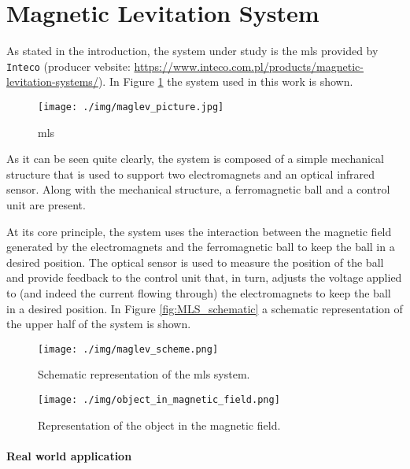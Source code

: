 \section{Magnetic Levitation System}
\label{sec:magnetic_levitation_system}

As stated in the introduction, the system under study is the \acrfull{mls} provided by \texttt{Inteco} (producer vebsite: \url{https://www.inteco.com.pl/products/magnetic-levitation-systems/}).
In Figure \ref{fig:MLS} the system used in this work is shown.

\begin{figure}[H]
    \centering
    \texttt{[image: ./img/maglev\_picture.jpg]}
    \caption{\acrlong{mls}}
    \label{fig:MLS}
\end{figure}

As it can be seen quite clearly, the system is composed of a simple mechanical structure that is used to support two electromagnets and an optical infrared sensor.
Along with the mechanical structure, a ferromagnetic ball and a control unit are present.

At its core principle, the system uses the interaction between the magnetic field generated by the electromagnets and the ferromagnetic ball to keep the ball in a desired position.
The optical sensor is used to measure the position of the ball and provide feedback to the control unit that, in turn, adjusts the voltage applied to (and indeed the current flowing through) the electromagnets to keep the ball in a desired position.
In Figure \ref{fig:MLS_schematic} a schematic representation of the upper half of the system is shown.

\begin{figure}[H]
    \centering
    \begin{minipage}{0.45\textwidth}
        \centering
        \texttt{[image: ./img/maglev\_scheme.png]}
        \caption{Schematic representation of the \acrshort{mls} system.}
        \label{fig:MLS_schematic}
    \end{minipage}
    \hfill
    \begin{minipage}{0.45\textwidth}
        \centering
        \texttt{[image: ./img/object\_in\_magnetic\_field.png]}
        \caption{Representation of the object in the magnetic field.}
        \label{fig:object_in_magnetic_field}
    \end{minipage}
\end{figure}

\paragraph{Real world application}

